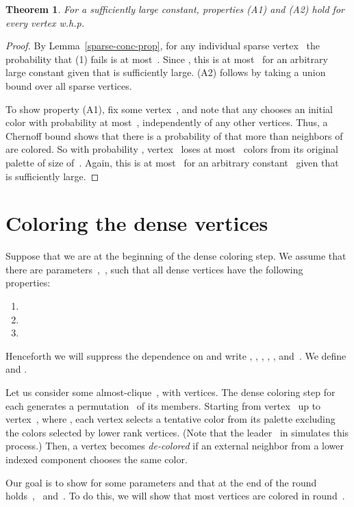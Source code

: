 \documentclass[11pt]{amsart}
\newtheorem{theorem}{Theorem}[section]
\begin{document}
\begin{theorem}
\label{initial-coloring-good-prop}
For  a sufficiently large constant, properties (A1) and (A2) hold for every vertex w.h.p.
\end{theorem}
\begin{proof}
By Lemma~\ref{sparse-conc-prop}, for any individual sparse vertex~ the probability that (1) fails is at most~. Since , this is at most~ for an arbitrary large constant  given that  is sufficiently large. (A2) follows by taking a union bound over all sparse vertices.

To show property (A1), fix some vertex~, and note that any  chooses an initial color with probability at most~, independently of any other vertices. Thus, a Chernoff bound shows that there is a probability of  that more than  neighbors of  are colored. So with probability , vertex~ loses at most~ colors from its original palette of size of~. Again, this is at most~ for an arbitrary constant~ given that~ is sufficiently large.
\end{proof}

\section{Coloring the dense vertices}
\label{color-dense}
Suppose that we are at the beginning of the  dense coloring step. We assume that there are parameters~,~, such that all dense vertices  have the following properties:
\begin{enumerate}
\item 
\item 
\item 
\end{enumerate}

Henceforth we will suppress the dependence on  and write , , , , , and~. We define  and .

Let us consider some almost-clique~, with  vertices. The dense coloring step for each  generates a permutation~ of its members. Starting from vertex~ up to vertex~, where , each vertex selects a tentative color from its palette excluding the colors selected by lower rank vertices. (Note that the leader~ in  simulates this process.) Then, a vertex becomes \emph{de-colored} if an external neighbor from a lower indexed component chooses the same color.

Our goal is to show for some parameters  and  that at the end of the round holds~,~ and~. To do this, we will show that most vertices are colored in round~.
\end{document}
